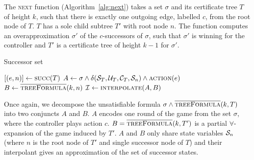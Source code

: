 The \textsc{next} function (Algorithm~\ref{alg:next}) takes a set $\sigma$ and its certificate tree $T$ of height $k$, such that there is exactly one outgoing edge, labelled $c$, from the root node of $T$.  $T$ has a sole child subtree $T'$ with root node $n$.  The function computes an overapproximation $\sigma'$ of the $c$-successors of $\sigma$, such that $\sigma'$ is winning for the controller and $T'$ is a certificate tree of height $k-1$ for $\sigma'$.

\begin{algorithm}
   \caption{Successor set}\label{alg:next}
   \begin{algorithmic}[1]
        \State $[(e, n)] \gets \Call{succ}{T}$ 
            \State $A \gets \sigma \land \delta(\cS_T, \cU_T, \cC_T, \cS_n) \land \Call{action}{e}$\label{alg:strat:partition:Ai}
            \State $B \gets \textsc{$\overline{\mbox{treeFormula}}$}(k, n) $\label{alg:strat:partition:Bi}
            \State $\mathcal{I} \gets \Call{interpolate}{A, B}$ \label{alg:strat:partition:I}
            \State {} \label{alg:strat:partition:return}
        \EndFunction
    \end{algorithmic}
\end{algorithm}

Once again, we decompose the unsatisfiable formula $\sigma \land \textsc{$\overline{\mbox{treeFormula}}$}(k, T)$ into two conjuncts $A$ and $B$.  $A$ encodes one round of the game from the set $\sigma$, where the controller plays action $c$.  $B = \textsc{$\overline{\mbox{treeFormula}}$}(k, T')$ is a partial $\forall$-expansion of the game induced by $T'$.  $A$ and $B$ only share state variables $\mathcal{S}_n$ (where $n$ is the root node of $T'$ and single successor node of $T$) and their interpolant gives an approximation of the set of successor states.

